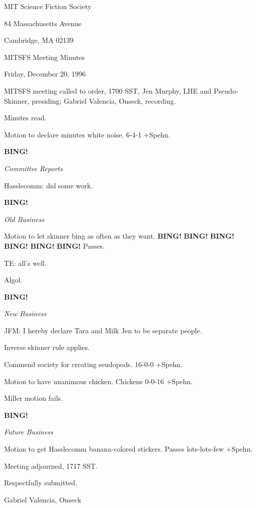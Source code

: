 \documentclass[12pt]{article}
\newcommand{\bing}{{\bf BING!} }
\newcommand{\goto}[1]{\bing \vskip 12pt \centerline{{\em{#1}}}}
\begin{document}
\begin{center}

MIT Science Fiction Society 

84 Massachusetts Avenue

Cambridge, MA 02139

\vspace{12pt}

MITSFS Meeting Minutes 

Friday, December 20, 1996

\end{center}
 
\vspace{18pt}

\setlength{\parskip}{6pt}

\noindent
MITSFS meeting called to order, 1700 SST,
Jen Murphy, LHE and Pseudo-Skinner, presiding; Gabriel Valencia, Onseck, recording.

Minutes read.

Motion to declare minutes white noise. 6-4-1 +Spehn.

\goto{Committee Reports}

Hasslecomm: did some work.

\goto{Old Business}

Motion to let skinner bing as often as they want. \bing \bing \bing \bing \bing \bing Passes.

TE: all's well.

Algol.

\goto{New Business}

JFM: I hereby declare Tara and Milk Jen to be separate people.

Inverse skinner rule applies.

Commend society for creating seudopods. 16-0-0 +Spehn.

Motion to have unanimous chicken. Chickens 0-0-16 +Spehn.

Miller motion fails.

\goto{Future Business}

Motion to get Hasslecomm banana-colored stickers. Passes lots-lots-few +Spehn.

\vspace{12pt}

\noindent
Meeting adjourned, 1717 SST.

\vspace{18pt}

\centerline{Respectfully submitted,}
\centerline{Gabriel Valencia, Onseck}
\end{document}
